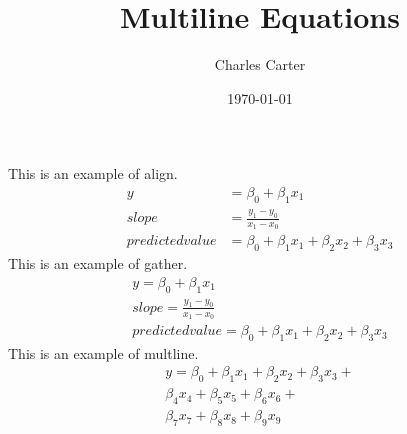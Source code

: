\documentclass{article}
\title{Multiline Equations}
\author{Charles Carter}
\date{\today{}}
\begin{document}
 
    \maketitle{}
	This is an example of align.
		\begin{align}
			y& = \beta_0 + \beta_1 x_1\\
			slope& = \frac{y_1 - y_0}{x_1 - x_0}\\
			predictedvalue& = \beta_0 + \beta_1 x_1 + \beta_2 x_2 + \beta_3 x_3
		\end{align}
	This is an example of gather.
		\begin{gather}
			y = \beta_0 + \beta_1 x_1\\
			slope = \frac{y_1 - y_0}{x_1 - x_0}\\
			predictedvalue = \beta_0 + \beta_1 x_1 + \beta_2 x_2 + \beta_3 x_3
		\end{gather}
	This is an example of multline.
		\begin{multline}
			y = \beta_0 + \beta_1 x_1 + \beta_2 x_2 + \beta_3 x_3 +\\
			\beta_4 x_4 + \beta_5 x_5 + \beta_6 x_6 +\\
			\beta_7 x_7 + \beta_8 x_8 + \beta_9 x_9
		\end{multline}
\end{document}
